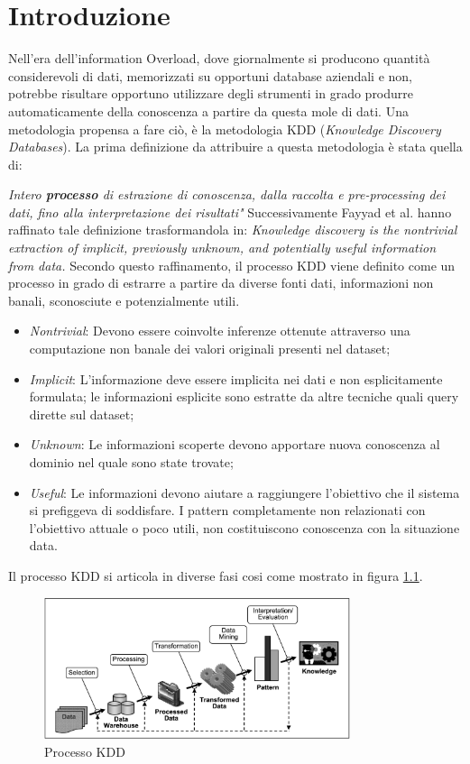 \chapter{Introduzione}
Nell'era dell'information Overload, dove giornalmente si producono quantità considerevoli di dati, memorizzati su opportuni database aziendali e non, potrebbe risultare opportuno utilizzare degli strumenti in grado produrre automaticamente della conoscenza a partire da questa mole di dati. Una metodologia propensa a fare ciò, è la metodologia KDD (\emph{Knowledge Discovery Databases}). 
La prima definizione da attribuire a questa metodologia è stata quella di:

\emph{Intero \textbf{processo} di estrazione di conoscenza, dalla raccolta e pre-processing dei dati, fino alla interpretazione dei risultati"\cite{DBLP:conf/kdd/1995}}
Successivamente Fayyad et al. hanno raffinato tale definizione trasformandola in: 
\emph{Knowledge discovery is the nontrivial extraction of implicit, previously unknown, and potentially useful information from data.}\cite{citeulike:1550195} 
Secondo questo raffinamento, il processo KDD viene definito come un processo in grado di estrarre a partire da diverse fonti dati, informazioni non banali, sconosciute e potenzialmente utili. 
\begin{itemize}
	\item \emph{Nontrivial}: Devono essere coinvolte inferenze ottenute attraverso una computazione non banale dei valori originali presenti nel dataset;
	\item \emph{Implicit}: L'informazione deve essere implicita nei dati e non esplicitamente formulata; le informazioni esplicite sono estratte da altre tecniche quali query dirette sul dataset;
	\item \emph{Unknown}: Le informazioni scoperte devono apportare nuova conoscenza al dominio nel quale sono state trovate;
	\item \emph{Useful}: Le informazioni devono aiutare a raggiungere l'obiettivo che il sistema si prefiggeva di soddisfare. I pattern completamente non relazionati con l'obiettivo attuale o poco utili, non costituiscono conoscenza con la situazione data.
\end{itemize}
Il processo KDD si articola in diverse fasi cosi come mostrato in figura \ref{kddprocess}.
\begin{figure}[hbtp]
\centering
\includegraphics[width=0.8\textwidth]{./images/kddprocess.png}
\caption{Processo KDD}
\label{kddprocess}
\end{figure}

